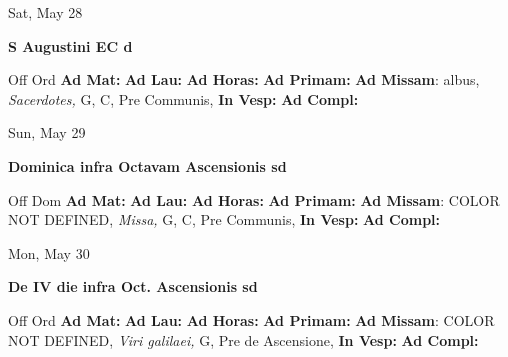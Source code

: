 \documentclass[10pt]{memoir}
\begin{document}
\begin{center}
\begin{minipage}{3.5in}
\vspace{2em}
\begin{center}Sat, May 28
\end{center}
\textbf{ \large S Augustini EC
\textnormal{\normalsize d}}

\begin{justify}Off Ord
\textbf{Ad Mat: }
\textbf{Ad Lau: }
\textbf{Ad Horas: }
\textbf{Ad Primam: }\textbf{Ad Missam}: albus, \textit{Sacerdotes,} G, C, Pre Communis, 
\textbf{In Vesp: }
\textbf{Ad Compl: }
\end{justify}
\end{minipage}
\end{center}

\begin{center}
\begin{minipage}{3.5in}
\vspace{2em}
\begin{center}Sun, May 29
\end{center}
\textbf{ \large Dominica infra Octavam Ascensionis
\textnormal{\normalsize sd}}

\begin{justify}Off Dom
\textbf{Ad Mat: }
\textbf{Ad Lau: }
\textbf{Ad Horas: }
\textbf{Ad Primam: }\textbf{Ad Missam}: COLOR NOT DEFINED, \textit{Missa,} G, C, Pre Communis, 
\textbf{In Vesp: }
\textbf{Ad Compl: }
\end{justify}
\end{minipage}
\end{center}

\begin{center}
\begin{minipage}{3.5in}
\vspace{2em}
\begin{center}Mon, May 30
\end{center}
\textbf{ \large De IV die infra Oct. Ascensionis
\textnormal{\normalsize sd}}

\begin{justify}Off Ord
\textbf{Ad Mat: }
\textbf{Ad Lau: }
\textbf{Ad Horas: }
\textbf{Ad Primam: }\textbf{Ad Missam}: COLOR NOT DEFINED, \textit{Viri galilaei,} G, Pre de Ascensione, 
\textbf{In Vesp: }
\textbf{Ad Compl: }
\end{justify}
\end{minipage}
\end{center}
\end{document}
